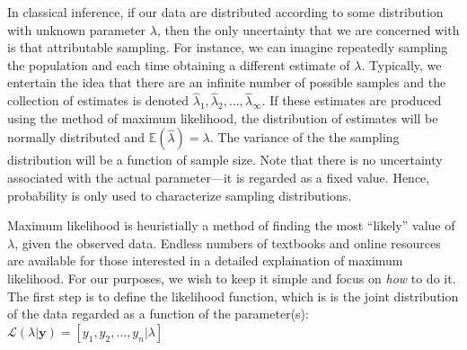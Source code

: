 In classical inference, if our data are distributed according to some
distribution with unknown parameter $\lambda$, then the only
uncertainty that we are concerned with is that attributable
sampling. For instance, we can imagine repeatedly sampling the
population and each time obtaining a different estimate of
$\lambda$. Typically, we entertain the idea that there are an infinite
number of possible samples and the collection of estimates is denoted
$\hat{\lambda}_1, \hat{\lambda}_2, \hdots, \hat{\lambda}_\infty$. If
these estimates are produced using the method of maximum likelihood,
the distribution of estimates will be normally distributed and
$\mathbb{E}(\hat{\lambda})=\lambda$. The variance of the the sampling
distribution will be a function of sample size. Note that there is
no uncertainty associated with the actual parameter---it is regarded
as a fixed value. Hence, probability is only used to characterize
sampling distributions.

Maximum likelihood is heuristially a method of finding the most ``likely''
value of $\lambda$, given the observed data. Endless numbers of
textbooks and online resources are available for those interested in a
detailed explaination of maximum likelihood. For our purposes, we wish
to keep it simple and focus on \textit{how} to do it. The first step
is to define the likelihood function, which is
is the joint distribution of the data regarded as a function of
the parameter(s):
$\mathcal{L}(\lambda | \mathbf{y}) = [y_1, y_2, \dots, y_n | \lambda]$

